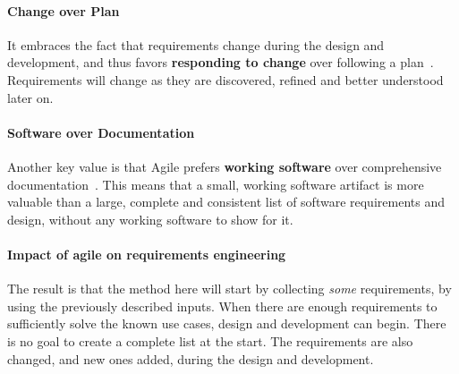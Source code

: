 \paragraph{Change over Plan}
It embraces the fact that requirements change during the design and development, and thus favors \textbf{responding to change} over following a plan~\cite{kentbeckManifestoAgileSoftware2001}.
Requirements will change as they are discovered, refined and better understood later on.


\paragraph{Software over Documentation}
Another key value is that Agile prefers \textbf{working software} over comprehensive documentation~\cite{kentbeckManifestoAgileSoftware2001}.
This means that a small, working software artifact is more valuable than a large, complete and consistent list of software requirements and design, without any working software to show for it.


\paragraph{Impact of agile on requirements engineering}
The result is that the method here will start by collecting \textit{some} requirements, by using the previously described inputs.
When there are enough requirements to sufficiently solve the known use cases, design and development can begin.
There is no goal to create a complete list at the start.
The requirements are also changed, and new ones added, during the design and development.